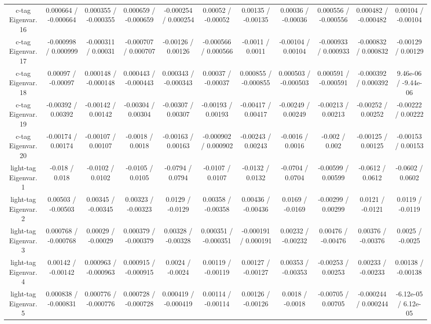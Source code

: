\begin{table}[htbp]
\begin{center}
\begin{tabular}{|c|c|c|c|c|c|c|c|c|c|c|}
  c-tag Eigenvar. 16 & 0.000664 / -0.000664 & 0.000355 / -0.000355 & 0.000659 / -0.000659 & -0.000254 / 0.000254 & 0.00052 / -0.00052 & 0.00135 / -0.00135 & 0.00036 / -0.00036 & 0.000556 / -0.000556 & 0.000482 / -0.000482 & 0.00104 / -0.00104 \\ 
  c-tag Eigenvar. 17 & -0.000998 / 0.000999 & -0.000311 / 0.00031 & -0.000707 / 0.000707 & -0.00126 / 0.00126 & -0.000566 / 0.000566 & -0.0011 / 0.0011 & -0.00104 / 0.00104 & -0.000933 / 0.000933 & -0.000832 / 0.000832 & -0.00129 / 0.00129 \\ 
  c-tag Eigenvar. 18 & 0.00097 / -0.00097 & 0.000148 / -0.000148 & 0.000443 / -0.000443 & 0.000343 / -0.000343 & 0.00037 / -0.00037 & 0.000855 / -0.000855 & 0.000503 / -0.000503 & 0.000591 / -0.000591 & -0.000392 / 0.000392 & 9.46e-06 / -9.44e-06 \\ 
  c-tag Eigenvar. 19 & -0.00392 / 0.00392 & -0.00142 / 0.00142 & -0.00304 / 0.00304 & -0.00307 / 0.00307 & -0.00193 / 0.00193 & -0.00417 / 0.00417 & -0.00249 / 0.00249 & -0.00213 / 0.00213 & -0.00252 / 0.00252 & -0.00222 / 0.00222 \\ 
  c-tag Eigenvar. 20 & -0.00174 / 0.00174 & -0.00107 / 0.00107 & -0.0018 / 0.0018 & -0.00163 / 0.00163 & -0.000902 / 0.000902 & -0.00243 / 0.00243 & -0.0016 / 0.0016 & -0.002 / 0.002 & -0.00125 / 0.00125 & -0.00153 / 0.00153 \\ 
  light-tag Eigenvar. 1 & -0.018 / 0.018 & -0.0102 / 0.0102 & -0.0105 / 0.0105 & -0.0794 / 0.0794 & -0.0107 / 0.0107 & -0.0132 / 0.0132 & -0.0704 / 0.0704 & -0.00599 / 0.00599 & -0.0612 / 0.0612 & -0.0602 / 0.0602 \\ 
  light-tag Eigenvar. 2 & 0.00503 / -0.00503 & 0.00345 / -0.00345 & 0.00323 / -0.00323 & 0.0129 / -0.0129 & 0.00358 / -0.00358 & 0.00436 / -0.00436 & 0.0169 / -0.0169 & -0.00299 / 0.00299 & 0.0121 / -0.0121 & 0.0119 / -0.0119 \\ 
  light-tag Eigenvar. 3 & 0.000768 / -0.000768 & 0.00029 / -0.00029 & 0.000379 / -0.000379 & 0.00328 / -0.00328 & 0.000351 / -0.000351 & -0.000191 / 0.000191 & 0.00232 / -0.00232 & 0.00476 / -0.00476 & 0.00376 / -0.00376 & 0.0025 / -0.0025 \\ 
  light-tag Eigenvar. 4 & 0.00142 / -0.00142 & 0.000963 / -0.000963 & 0.000915 / -0.000915 & 0.0024 / -0.0024 & 0.00119 / -0.00119 & 0.00127 / -0.00127 & 0.00353 / -0.00353 & -0.00253 / 0.00253 & 0.00233 / -0.00233 & 0.00138 / -0.00138 \\ 
  light-tag Eigenvar. 5 & 0.000838 / -0.000831 & 0.000776 / -0.000776 & 0.000728 / -0.000728 & 0.000419 / -0.000419 & 0.00114 / -0.00114 & 0.00126 / -0.00126 & 0.0018 / -0.0018 & -0.00705 / 0.00705 & -0.000244 / 0.000244 & -6.12e-05 / 6.12e-05 \\ 

\end{tabular}
\end{center}
\end{table}
